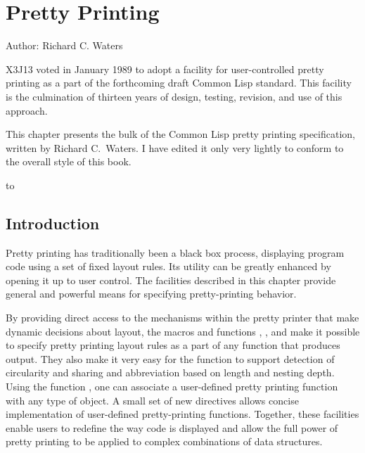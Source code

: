 

\clearpage\def\pagestatus{FINAL PROOF}

\chapter{Pretty Printing}
\label{PPRINT}

Author: Richard C. Waters
\prefaceword
\begin{new}
X3J13 voted in January 1989
to adopt a facility for user-controlled pretty printing
as a part of the forthcoming draft Common Lisp standard.
This facility is the culmination of thirteen
years of design, testing, revision, and use of this approach.
\end{new}
This chapter presents the bulk of the Common Lisp
pretty printing specification, written by Richard C.~Waters.  I have
edited it only very lightly
to conform to the overall style of this book.

\noindent\hbox to \textwidth{\hss---Guy L. Steele Jr.}

\section{Introduction}

Pretty printing has traditionally been a black box process, displaying
program code using a set of fixed layout rules.  Its utility can be greatly
enhanced by opening it up to user control.  The facilities described
in this chapter provide general and powerful means for specifying pretty-printing
behavior.

By providing direct access to the mechanisms within the pretty printer that
make dynamic decisions about layout, the macros and functions
, , and  make
it possible to specify pretty printing layout rules as a part of any
function that produces output.  They also make it very easy for the
function to support
detection of circularity and sharing and abbreviation based on length and
nesting depth.  Using the function
, one can associate a user-defined pretty
printing function with any type of object.  A small set of new 
directives allows concise implementation of user-defined pretty-printing
functions.
Together, these facilities
enable users to redefine the way code is displayed and allow the full power
of pretty printing to be applied to complex combinations of data
structures.

